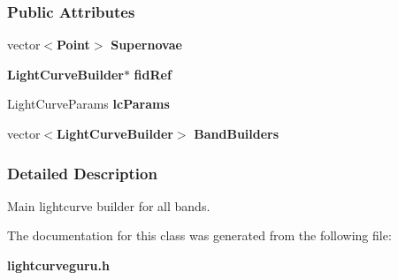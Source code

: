\subsubsection*{Public Attributes}
\begin{CompactItemize}
\item 
{}
vector$<${\bf Point}$>$ {\bf Supernovae}\label{class_lightcurveguru_m0}

\item 
{}
{\bf Light\-Curve\-Builder}$\ast$ {\bf fid\-Ref}\label{class_lightcurveguru_m1}

\item 
{}
Light\-Curve\-Params {\bf lc\-Params}\label{class_lightcurveguru_m2}

\item 
{}
vector$<${\bf Light\-Curve\-Builder}$>$ {\bf Band\-Builders}\label{class_lightcurveguru_m3}

\end{CompactItemize}


\subsubsection{Detailed Description}
Main lightcurve builder for all bands.



The documentation for this class was generated from the following file:\begin{CompactItemize}
\item 
{\bf lightcurveguru.h}\end{CompactItemize}
